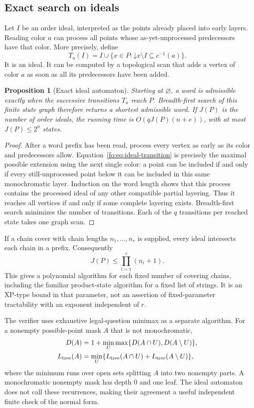 \documentclass[11pt,letterpaper]{article}
\numberwithin{equation}{section}
\newtheorem{proposition}[proposition]{Proposition}
\theoremstyle{definition}
\theoremstyle{remark}
\theoremstyle{definition}
\begin{document}
\subsection{Exact search on ideals}
Let $I$ be an order ideal, interpreted as the points already placed into early
layers. Reading color $a$ can process all points whose as-yet-unprocessed
predecessors have that color. More precisely, define
\begin{equation}\label{fo:eq:ideal-transition}
 T_a(I)=I\cup\{x\in P:\mathord\downarrow x\setminus I\subseteq c^{-1}(a)\}.
\end{equation}
It is an ideal. It can be computed by a topological scan that adds a vertex of
color $a$ as soon as all its predecessors have been added.

\begin{proposition}[Exact ideal automaton]\label{fo:prop:ideal}
Starting at $\varnothing$, a word is admissible exactly when the successive
transitions $T_a$ reach $P$. Breadth-first search of this finite state graph
therefore returns a shortest admissible word. If $J(P)$ is the number of order
ideals, the running time is $O(qJ(P)(n+e))$, with at most $J(P)\le2^n$ states.
\end{proposition}
\begin{proof}
After a word prefix has been read, process every vertex as early as its color
and predecessors allow. Equation~\eqref{fo:eq:ideal-transition} is precisely the
maximal possible extension using the next single color: a point can be
included if and only if every still-unprocessed point below it can be included
in this same monochromatic layer. Induction on the word length shows that this
process contains the processed ideal of any other compatible partial layering.
Thus it reaches all vertices if and only if some complete layering exists.
Breadth-first search minimizes the number of transitions. Each of the $q$
transitions per reached state takes one graph scan.
\end{proof}

If a chain cover with chain lengths $n_1,\ldots,n_r$ is supplied, every ideal
intersects each chain in a prefix. Consequently
\[
 J(P)\le\prod_{i=1}^{r}(n_i+1).
\]
This gives a polynomial algorithm for each fixed number of covering chains,
including the familiar product-state algorithm for a fixed list of strings.
It is an XP-type bound in that parameter, not an assertion of fixed-parameter
tractability with an exponent independent of $r$.

The verifier uses exhaustive legal-question minimax as a separate algorithm.
For a nonempty possible-point mask $A$ that is not monochromatic,
\begin{align*}
 D(A)&=1+\min_{U}\max\{D(A\cap U),D(A\setminus U)\},\\
 L_{\rm tree}(A)&=\min_U\{L_{\rm tree}(A\cap U)+L_{\rm tree}(A\setminus U)\},
\end{align*}
where the minimum runs over open sets splitting $A$ into two nonempty parts.
A monochromatic nonempty mask has depth $0$ and one leaf. The ideal automaton
does not call these recurrences, making their agreement a useful independent
finite check of the normal form.
\end{document}
